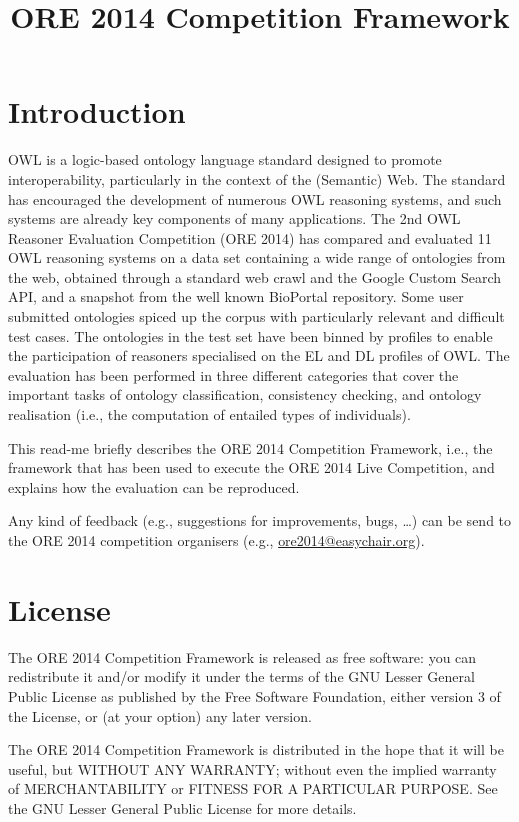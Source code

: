 \documentclass{article}
\title{ORE 2014 Competition Framework}
\begin{document}
\maketitle



\section{Introduction}


OWL is a logic-based ontology language standard designed to promote interoperability, particularly in the context of the (Semantic) Web. The standard has encouraged the development of numerous OWL reasoning systems, and such systems are already key components of many applications. The 2nd OWL Reasoner Evaluation Competition (ORE 2014) has compared and evaluated 11 OWL reasoning systems on a data set containing a wide range of ontologies from the web, obtained through a standard web crawl and the Google Custom Search API, and a snapshot from the well known BioPortal repository. Some user submitted ontologies spiced up the corpus with particularly relevant and difficult test cases. The ontologies in the test set have been binned by profiles to enable the participation of reasoners specialised on the EL and DL profiles of OWL. The evaluation has been performed in three different categories that cover the important tasks of ontology classification, consistency checking, and ontology realisation (i.e., the computation of entailed types of individuals).


This read-me briefly describes the ORE 2014 Competition Framework, i.e., the framework that has been used to execute the ORE 2014 Live Competition, and explains how the evaluation can be reproduced.


Any kind of feedback (e.g., suggestions for improvements, bugs, \ldots) can be send to the ORE 2014 competition organisers (e.g., \url{ore2014@easychair.org}).


\section{License}

The ORE 2014 Competition Framework is released as free software: you can redistribute it and/or modify
it under the terms of the GNU Lesser General Public License as published by
the Free Software Foundation, either version 3 of the License, or
(at your option) any later version.
   
The ORE 2014 Competition Framework is distributed in the hope that it will be useful,
but WITHOUT ANY WARRANTY; without even the implied warranty of
MERCHANTABILITY or FITNESS FOR A PARTICULAR PURPOSE.  See the
GNU Lesser General Public License for more details.
   
\end{document}
